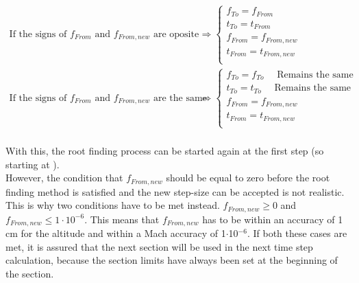 \begin{equation}\label{eq:updatedPointsRoot}
\begin{split}
\text{If the signs of }f_{From}\text{ and }f_{From,new}\text{ are oposite}&\Rightarrow\begin{cases}
f_{To}=f_{From}\\
t_{To}=t_{From} \\
f_{From}=f_{From,new}\\
t_{From}=t_{From,new} \\ 
\end{cases}\\
\text{If the signs of }f_{From}\text{ and }f_{From,new}\text{ are the same}&\Rightarrow\begin{cases}
f_{To}=f_{To} \quad \text{  Remains the same}\\
t_{To}=t_{To} \quad \text{  Remains the same}\\
f_{From}=f_{From,new}\\
t_{From}=t_{From,new} \\ 
\end{cases}\\
\end{split}
\end{equation}

\noindent
With this, the root finding process can be started again at the first step (so starting at ).\\

\noindent
However, the condition that $f_{From,new}$ should be equal to zero before the root finding method is satisfied and the new step-size can be accepted is not realistic. This is why two conditions have to be met instead. $f_{From,new}\geq 0$ and $f_{From,new}\leq 1\cdot10^{-6}$. This means that $f_{From,new}$ has to be within an accuracy of 1 cm for the altitude and within a Mach accuracy of 1$\cdot$10$^{-6}$. If both these cases are met, it is assured that the next section will be used in the next time step calculation, because the section limits have always been set at the beginning of the section.  




